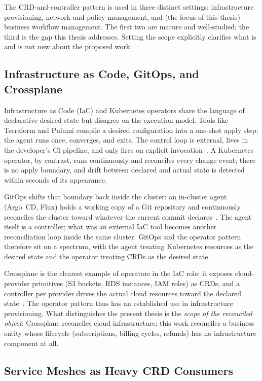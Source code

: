 The CRD-and-controller pattern is used in three distinct settings: infrastructure provisioning, network and policy management, and (the focus of this thesis) business workflow management. The first two are mature and well-studied; the third is the gap this thesis addresses. Setting the scope explicitly clarifies what is and is not new about the proposed work.

\subsection{Infrastructure as Code, GitOps, and Crossplane}

Infrastructure as Code (IaC) and Kubernetes operators share the language of declarative desired state but disagree on the execution model. Tools like Terraform and Pulumi compile a desired configuration into a one-shot apply step: the agent runs once, converges, and exits. The control loop is external, lives in the developer's CI pipeline, and only fires on explicit invocation~\cite{morris2020iac, kubernetes_declarative_automation}. A Kubernetes operator, by contrast, runs continuously and reconciles every change event; there is no apply boundary, and drift between declared and actual state is detected within seconds of its appearance.

GitOps shifts that boundary back inside the cluster: an in-cluster agent (Argo~CD, Flux) holds a working copy of a Git repository and continuously reconciles the cluster toward whatever the current commit declares~\cite{gitops, argocd}. The agent itself is a controller; what was an external IaC tool becomes another reconciliation loop inside the same cluster. GitOps and the operator pattern therefore sit on a spectrum, with the agent treating Kubernetes resources as the desired state and the operator treating CRDs as the desired state.

Crossplane is the clearest example of operators in the IaC role: it exposes cloud-provider primitives (S3 buckets, RDS instances, IAM roles) as CRDs, and a controller per provider drives the actual cloud resources toward the declared state~\cite{crossplane}. The operator pattern thus has an established use in infrastructure provisioning. What distinguishes the present thesis is the \emph{scope of the reconciled object}: Crossplane reconciles cloud infrastructure; this work reconciles a business entity whose lifecycle (subscriptions, billing cycles, refunds) has no infrastructure component at all.

\subsection{Service Meshes as Heavy CRD Consumers}

